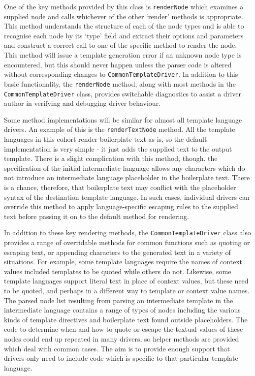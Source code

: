 One of the key methods provided by this class is \verb!renderNode! which examines a supplied node and calls whichever of the other `render' methods is appropriate. This method understands the structure of each of the node types and is able to recognise each node by its `type' field and extract their options and parameters and construct a correct call to one of the specific method to render the node. This method will issue a template generation error if an unknown node type is encountered, but this should never happen unless the parser code is altered without corresponding changes to \verb!CommonTemplateDriver!. In addition to this basic functionality, the \verb!renderNode! method, along with most methods in the \verb!CommonTemplateDriver! class, provides switchable diagnostics to assist a driver author in verifying and debugging driver behaviour.

Some method implementations will be similar for almost all template language drivers. An example of this is the \verb!renderTextNode! method. All the template languages in this cohort render boilerplate text as-is, so the default implementation is very simple - it just adds the supplied text to the output template. There is a slight complication with this method, though. the specification of the initial intermediate language allows any characters which do not introduce an intermediate language placeholder in the boilerplate text. There is a chance, therefore, that boilerplate text may conflict with the placeholder syntax of the destination template language. In such cases, individual drivers can override this method to apply language-specific escaping rules to the supplied text before passing it on to the default method for rendering.

In addition to these key rendering methods, the \verb!CommonTemplateDriver! class also provides a range of overridable methods for common functions such as quoting or escaping text, or appending characters to the generated text in a variety of situations. For example, some template languages require the names of context values included templates to be quoted while others do not. Likewise, some template languages support literal text in place of context values, but these need to be quoted, and perhaps in a different way to template or context value names. The parsed node list resulting from parsing an intermediate template in the intermediate language contains a range of types of nodes including the various kinds of template directives and boilerplate text found outside placeholders. The code to determine when and how to quote or escape the textual values of these nodes could end up repeated in many drivers, so helper methods are provided which deal with common cases. The aim is to provide enough support that drivers only need to include code which is specific to that particular template language.

